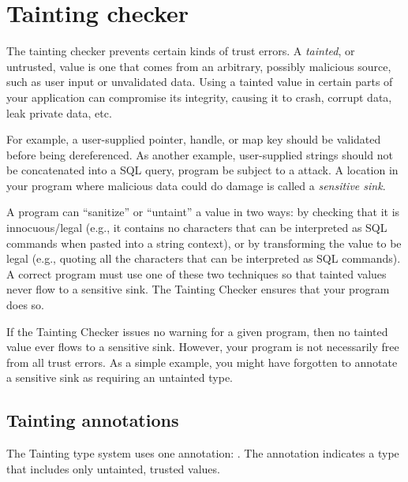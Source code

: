 \htmlhr
\chapter{Tainting checker\label{tainting-checker}}

The tainting checker prevents certain kinds of trust errors.
A \emph{tainted}, or untrusted, value is one that comes from an arbitrary,
possibly malicious source, such as user input or unvalidated data.
Using a tainted value in certain parts of your application can compromise
its integrity, causing it to crash, corrupt data, leak private data, etc.


For example, a user-supplied pointer, handle, or map key should be
validated before being dereferenced.
As another example, user-supplied strings should not be concatenated into a
SQL query, program be subject to a 
 attack.
A location in your program where malicious data could do damage is
called a \emph{sensitive sink}.

A program can ``sanitize'' or ``untaint'' a value in two ways:  by checking
that it is innocuous/legal (e.g., it contains no characters that can be
interpreted as SQL commands when pasted into a string context), or by
transforming the value to be legal (e.g., quoting all the characters that
can be interpreted as SQL commands).  A correct program must use one of
these two techniques so that tainted values never flow to a sensitive sink.
The Tainting Checker ensures that your program does so.

If the Tainting Checker issues no warning for a given program, then no
tainted value ever flows to a sensitive sink.  However, your program is not
necessarily free from all trust errors.  As a simple example, you might
have forgotten to annotate a sensitive sink as requiring an untainted type.


\section{Tainting annotations\label{tainting-annotations}}


The Tainting type system uses one annotation:
.  The annotation indicates
a type that includes only untainted, trusted values.

